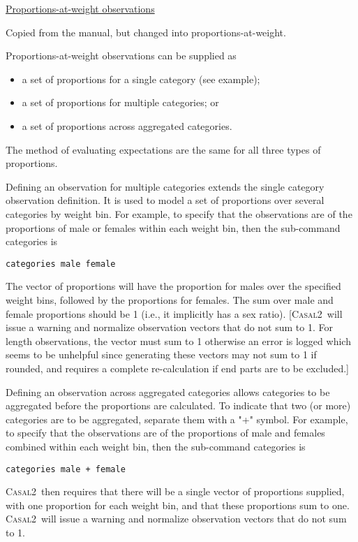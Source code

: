 \documentclass[a4paper,11pt,twoside,pdftex,draft]{article}
\newcommand{\CNAME}{\textsc{Casal2}}
\begin{document}
\bigskip
\underline{Proportions-at-weight observations}

Copied from the manual, but changed into proportions-at-weight.

Proportions-at-weight observations can be supplied as

\begin{itemize}
	\item a set of proportions for a single category (see example);
	\item a set of proportions for multiple categories; or
	\item a set of proportions across aggregated categories.
\end{itemize}

The method of evaluating expectations are the same for all three types of proportions.

Defining an observation for multiple categories extends the single category observation definition. It is used to model a set of proportions over several categories by weight bin. For example, to specify that the observations are of the proportions of male or females within each weight bin, then the sub-command categories is

\texttt{categories male female}

The vector of proportions will have the proportion for males over the specified weight bins, followed by the proportions for females. The sum over male and female proportions should be 1 (i.e., it implicitly has a sex ratio). [\CNAME~will issue a warning and normalize observation vectors that do not sum to 1. For length observations, the vector must sum to 1 otherwise an error is logged which seems to be unhelpful since generating these vectors may not sum to 1 if rounded, and requires a complete re-calculation if end parts are to be excluded.]

Defining an observation across aggregated categories allows categories to be aggregated before the proportions are calculated.  To indicate that two (or more) categories are to be aggregated, separate them with a "+" symbol. For example, to specify that the observations are of the proportions of male and females combined within each weight bin, then the sub-command categories is

\texttt{categories male + female}

\CNAME~then requires that there will be a single vector of proportions supplied, with one proportion for each weight bin, and that these proportions sum to one. \CNAME~will issue a warning and normalize observation vectors that do not sum to 1.
\end{document}
